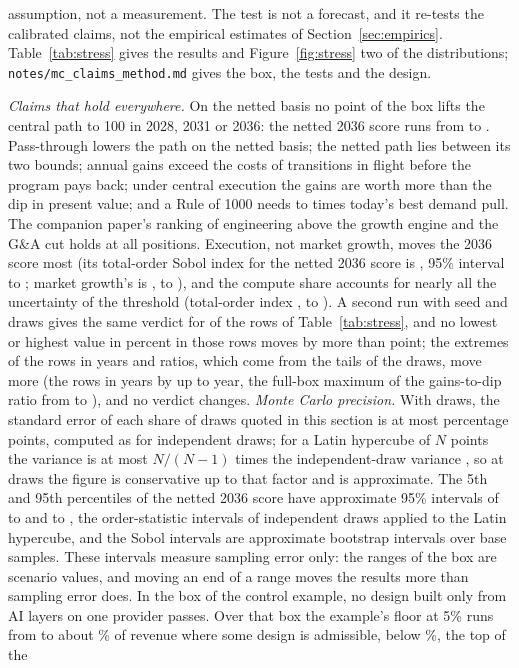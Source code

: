 assumption, not a measurement. The test is not a forecast, and it re-tests the calibrated claims, not the empirical estimates of Section~\ref{sec:empirics}. Table~\ref{tab:stress} gives the results and Figure~\ref{fig:stress} two of the distributions; \texttt{notes/mc\_claims\_method.md} gives the box, the tests and the design.



\emph{Claims that hold everywhere.} On the netted basis no point of the box lifts the central path to 100 in 2028, 2031 or 2036: the netted 2036 score runs from \StNetSixMin{} to \StNetSixMax. Pass-through lowers the path on the netted basis; the netted path lies between its two bounds; annual gains exceed the costs of transitions in flight before the program pays back; under central execution the gains are worth more than the dip in present value; and a Rule of 1000 needs \StPullMin{} to \StPullMax{} times today's best demand pull. The companion paper's ranking of engineering above the growth engine and the G\&A cut holds at all \lpNPositions{} positions. Execution, not market growth, moves the 2036 score most (its total-order Sobol index for the netted 2036 score is \StSobolExec, 95\% interval \StSobolExecLo{} to \StSobolExecHi; market growth's is \StSobolG, \StSobolGLo{} to \StSobolGHi), and the compute share accounts for nearly all the uncertainty of the threshold (total-order index \StSobolCc, \StSobolCcLo{} to \StSobolCcHi\StSobolCcAboveOne). A second run with seed \StSeedTwo{} and \StSeedTwoDraws{} draws gives the same verdict for \StSeedTwoAgree{} of the \StSeedTwoRows{} rows of Table~\ref{tab:stress}, and no lowest or highest value in percent in those rows moves by more than \StSeedTwoMaxDiff{} point; the extremes of the rows in years and ratios, which come from the tails of the draws, move more (the rows in years by up to \StSeedTwoMaxDiffYr{} year, the full-box maximum of the gains-to-dip ratio from \StSeedTwoRatioMaxOne{} to \StSeedTwoRatioMaxTwo), and no verdict changes. \emph{Monte Carlo precision.} With \StDraws{} draws, the standard error of each share of draws quoted in this section is at most \StMcShareSeMax{} percentage points, computed as for independent draws; for a Latin hypercube of $N$ points the variance is at most $N/(N-1)$ times the independent-draw variance \citep{owen1997scrambled}, so at \StDraws{} draws the figure is conservative up to that factor and is approximate. The 5th and 95th percentiles of the netted 2036 score have approximate 95\% intervals of \StNetSixPFiveCiLo{} to \StNetSixPFiveCiHi{} and \StNetSixPNinetyFiveCiLo{} to \StNetSixPNinetyFiveCiHi, the order-statistic intervals of independent draws applied to the Latin hypercube, and the Sobol intervals are approximate bootstrap intervals over \StSobolN{} base samples. These intervals measure sampling error only: the ranges of the box are scenario values, and moving an end of a range moves the results more than sampling error does. In the box of the control example, no design built only from AI layers on one provider passes. Over that box the example's floor at 5\% runs from \StAminFloorMin{} to about \StAminFloorMax\% of revenue where some design is admissible, below \AminHi\%, the top of the 